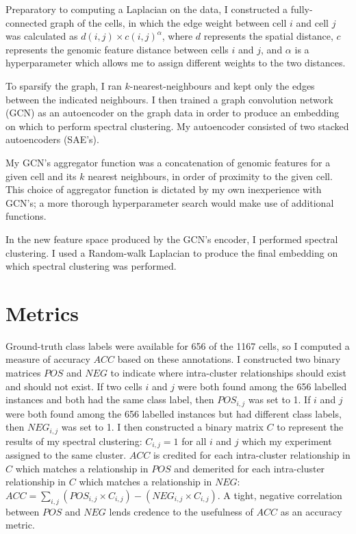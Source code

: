 \documentclass{article}
\newcommand{\nData}{1167}
\begin{document}
Preparatory to computing a Laplacian on the data, I constructed a fully-connected graph of the cells, in which the edge weight between cell $i$ and cell $j$ was calculated as $d(i,j) \times c(i,j)^\alpha$, where $d$ represents the spatial distance, $c$ represents the genomic feature distance between cells $i$ and $j$, and $\alpha$ is a hyperparameter which allows me to assign different weights to the two distances.

To sparsify the graph, I ran $k$-nearest-neighbours and kept only the edges between the indicated neighbours. I then trained a graph convolution network (GCN) as an autoencoder on the graph data in order to produce an embedding on which to perform spectral clustering. My autoencoder consisted of two stacked autoencoders (SAE's).

My GCN's aggregator function was a concatenation of genomic features for a given cell and its $k$ nearest neighbours, in order of proximity to the given cell. This choice of aggregator function is dictated by my own inexperience with GCN's; a more thorough hyperparameter search would make use of additional functions.

In the new feature space produced by the GCN's encoder, I performed spectral clustering. I used a Random-walk Laplacian to produce the final embedding on which spectral clustering was performed.

\section{Metrics}

Ground-truth class labels were available for 656 of the \nData{} cells, so I computed a measure of accuracy $ACC$ based on these annotations. I constructed two binary matrices $POS$ and $NEG$ to indicate where intra-cluster relationships should exist and should not exist. If two cells $i$ and $j$ were both found among the 656 labelled instances and both had the same class label, then $POS_{i,j}$ was set to 1. If $i$ and $j$ were both found among the 656 labelled instances but had different class labels, then $NEG_{i,j}$ was set to 1. I then constructed a binary matrix $C$ to represent the results of my spectral clustering: $C_{i,j} = 1$ for all $i$ and $j$ which my experiment assigned to the same cluster. $ACC$ is credited for each intra-cluster relationship in $C$ which matches a relationship in $POS$ and demerited for each intra-cluster relationship in $C$ which matches a relationship in $NEG$: $ACC = \sum_{i,j} (POS_{i,j}\times C_{i,j}) - (NEG_{i,j}\times C_{i,j})$. A tight, negative correlation between $POS$ and $NEG$ lends credence to the usefulness of $ACC$ as an accuracy metric. 
\end{document}
